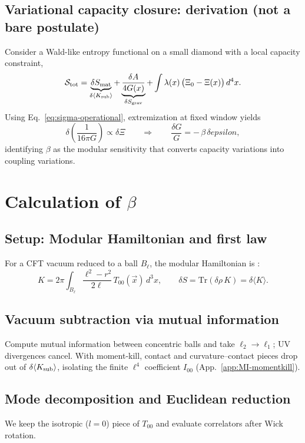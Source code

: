 \documentclass[aps,prd,onecolumn,superscriptaddress,nofootinbib]{revtex4-2}
\def\eps{epsilon}%
\newcommand{\eps}{\varepsilon}
\begin{document}
\subsection{Variational capacity closure: derivation (not a bare postulate)}
\label{sec:variational-closure}
Consider a Wald-like entropy functional on a small diamond with a local capacity constraint,
\begin{equation}
\mathcal{S}_{\rm tot} = \underbrace{\delta S_{\rm mat}}_{\delta\langle K_{\rm sub}\rangle} + \underbrace{\frac{\delta A}{4G(x)}}_{\delta S_{\rm grav}} + \int \lambda(x)\,\big(\Xi_0-\Xi(x)\big)\,d^4x.
\end{equation}
Using Eq.~\eqref{eq:sigma-operational}, extremization at fixed window yields
\begin{equation}
\delta\!\left(\frac{1}{16\pi G}\right) \propto \delta \Xi
\qquad\Rightarrow\qquad
\frac{\delta G}{G} = -\,\beta\,\delta \eps,
\end{equation}
identifying $\beta$ as the modular sensitivity that converts capacity variations into coupling variations.

\section{Calculation of \texorpdfstring{$\beta$}{beta}}
\label{sec:beta-calc}

\subsection{Setup: Modular Hamiltonian and first law}
For a CFT vacuum reduced to a ball $B_\ell$, the modular Hamiltonian is \cite{Casini2011}:
\begin{equation}
K = 2\pi \int_{B_\ell} \frac{\ell^2 - r^2}{2\ell}\, T_{00}(\vec{x})\, d^3x,
\qquad
\delta S = \mathrm{Tr}(\delta\rho\, K) = \delta \langle K \rangle.
\end{equation}

\subsection{Vacuum subtraction via mutual information}
Compute mutual information between concentric balls and take $\ell_2\to\ell_1$; UV divergences cancel. With moment-kill, contact and curvature--contact pieces drop out of $\delta\langle K_{\rm sub}\rangle$, isolating the finite $\ell^4$ coefficient $I_{00}$ (App.~\ref{app:MI-momentkill}).

\subsection{Mode decomposition and Euclidean reduction}
We keep the isotropic ($l=0$) piece of $T_{00}$ and evaluate correlators after Wick rotation.
\end{document}
